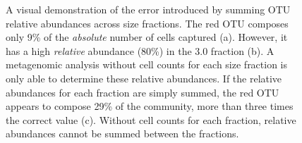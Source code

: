 \begin{figure}
\quad
{}
\caption[Summing relative abundances across size fractions]{A visual demonstration of the error introduced by summing OTU relative abundances across size fractions. The red OTU composes only 9\% of the \emph{absolute} number of cells captured (a). However, it has a high \emph{relative} abundance (80\%) in the 3.0 \micron{} fraction (b). A metagenomic analysis without cell counts for each size fraction is only able to determine these relative abundances. If the relative abundances for each fraction are simply summed, the red OTU appears to compose 29\% of the community, more than three times the correct value (c). Without cell counts for each fraction, relative abundances cannot be summed between the fractions.}
\label{fig:fractionabundances}
\end{figure}
